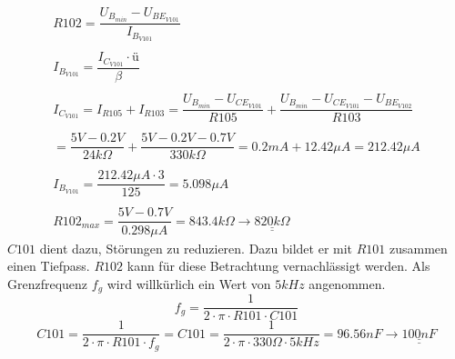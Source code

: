 \[ \begin{array}{l}
R102 
= \dfrac{U_{B_{min}} - U_{BE_{V101}}}{I_{B_{V101}}}\\\\
I_{B_{V101}} 
= \dfrac{I_{C_{V101}} \cdot ü}{\beta}\\\\
I_{C_{V101}} 
= I_{R105} + I_{R103} 
= \dfrac{U_{B_{min}} - U_{CE_{V101}}}{R105} 
+ \dfrac{U_{B_{min}} - U_{CE_{V101}} - U_{BE_{V102}}}{R103} \\\\
= \dfrac{5 V - 0.2 V}{24 k \Omega} + \dfrac{5 V - 0.2 V - 0.7 V}{330 k \Omega} 
= 0.2 mA + 12.42 \mu A 
= 212.42 \mu A \\\\
I_{B_{V101}} 
= \dfrac{212.42 \mu A \cdot 3}{125} 
= 5.098 \mu A \\\\
R102_{max} 
= \dfrac{5 V - 0.7 V}{0.298 \mu A} 
= 843.4 k \Omega 
\rightarrow \underline{\underline{820 k \Omega}}
\end{array} \]
%
$C101$ dient dazu, Störungen zu reduzieren. Dazu bildet er mit $R101$ zusammen 
einen Tiefpass. $R102$ kann für diese Betrachtung vernachlässigt werden. Als 
Grenzfrequenz $f_g$ wird willkürlich ein Wert von $5 kHz$ angenommen. 
\[ f_g = \dfrac{1}{2 \cdot \pi \cdot R101 \cdot C101} \]
\[ C101 = \dfrac{1}{2 \cdot \pi \cdot R101 \cdot f_g} 
= C101 = \dfrac{1}{2 \cdot \pi \cdot 330 \Omega \cdot 5 kHz} = 96.56 nF 
\rightarrow \underline{\underline{100 nF}} \]
